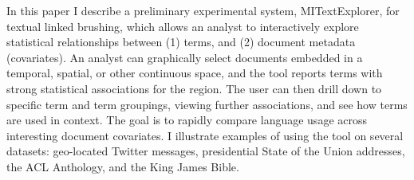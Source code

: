 In this paper I describe a preliminary experimental system, MITextExplorer, for textual linked brushing, which allows an analyst to interactively explore statistical relationships between (1) terms, and (2) document metadata (covariates).  An analyst can graphically select documents embedded in a temporal, spatial, or other continuous space, and the tool reports terms with strong statistical associations for the region.  The user can then drill down to specific term and term groupings, viewing further associations, and see how terms are used in context.  The goal is to rapidly compare language usage across interesting document covariates. I illustrate examples of using the tool on several datasets: geo-located Twitter messages, presidential State of the Union addresses, the ACL Anthology, and the King James Bible.
